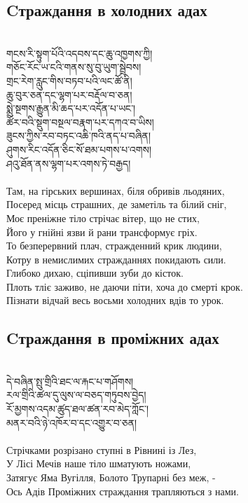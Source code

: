 \subsection*{Cтраждання в холодних адах}
\\
\ti
གངས་རི་སྟུག་པོའི་འདབས་དང་ཆུ་འཁྱགས་ཀྱི། \\
གཅོང་རོང་ཡ་ངའི་གནས་སུ་བུ་ཡུག་སྦྲེབས། \\
གྲང་རེག་རླུང་གིས་བཏབ་པའི་ལང་ཚོ་ནི། \\
ཆུ་བུར་ཅན་དང་ལྷག་པར་བརྡོལ་བ་ཅན། \\
སྨྲེ་སྔགས་རྒྱུན་མི་ཆད་པར་འདོན་པ་ཡང་། \\
ཚོར་བའི་སྡུག་བསྔལ་བརྣག་པར་དཀའ་བ་ཡིས།\\
ཟུངས་ཀྱིས་རབ་བཏང་འཆི་ཁའི་ནད་པ་བཞིན།\\
ཤུགས་རིང་འདོན་ཅིང་སོ་ཐམ་པགས་པ་འགས། \\
ཤའུ་ཐོན་ནས་ལྷག་པར་འགས་ཏེ་བརྒྱད།\\
\\
\ru
Там, на гірських вершинах, біля обривів льодяних,\\
Посеред місць страшних, де заметіль та білий сніг,\\
Моє преніжне тіло стрічає вітер, що не стих,\\
Його у гнійні язви й рани трансформує гріх.\\
То безперервний плач, стражденний крик людини,\\
Котру в немислимих стражданнях покидають сили.\\
Глибоко дихаю, сціпивши зуби до кісток.\\
Плоть тліє заживо, не даючи піти, хоча до смерті крок.\\
Пізнати відчай весь восьми холодних вдів то урок.\\

\newpage
\subsection*{Cтраждання в проміжних адах}
\\
\ti
དེ་བཞིན་སྤུ་གྲིའི་ཐང་ལ་རྐང་པ་གཤོགས།\\
རལ་གྲིའི་ཚལ་དུ་ལུས་ལ་བཅད་གཏུབས་བྱེད།\\
རོ་མྱགས་འདམ་ཚུད་ཐལ་ཚན་རབ་མེད་ཀློང་། \\
མནར་བའི་ཉེ་འཁོར་བ་དང་འགྱུར་བ་ཅན།\\
\\
\ru
Стрічками розрізано ступні в Рівнині із Лез,\\
У Лісі Мечів наше тіло шматують ножами,\\
Затягує Яма Вугілля, Болото Трупарні без меж, -\\
Ось Адів Проміжних страждання трапляються з нами.\\

